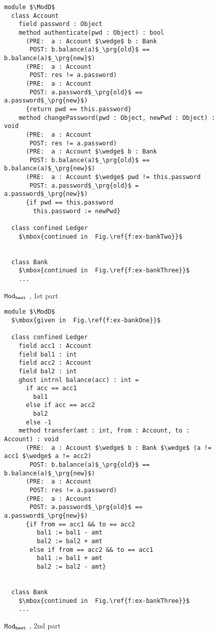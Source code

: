 \begin{figure}[htb]
\begin{lstlisting}[mathescape=true, frame=lines]
module $\ModD$
  class Account
    field password : Object
    method authenticate(pwd : Object) : bool
      (PRE:  a : Account $\wedge$ b : Bank
       POST: b.balance(a)$_\prg{old}$ == b.balance(a)$_\prg{new}$)
      (PRE:  a : Account
       POST: res != a.password)
      (PRE:  a : Account
       POST: a.password$_\prg{old}$ == a.password$_\prg{new}$)
      {return pwd == this.password}
    method changePassword(pwd : Object, newPwd : Object) : void
      (PRE:  a : Account
       POST: res != a.password)
      (PRE:  a : Account $\wedge$ b : Bank
       POST: b.balance(a)$_\prg{old}$ == b.balance(a)$_\prg{new}$)
      (PRE:  a : Account $\wedge$ pwd != this.password
       POST: a.password$_\prg{old}$ = a.password$_\prg{new}$)
      {if pwd == this.password
        this.password := newPwd}

  class confined Ledger
    $\mbox{continued in  Fig.\ref{f:ex-bankTwo}}$
      

  class Bank
    $\mbox{continued in  Fig.\ref{f:ex-bankThree}}$
    ...
\end{lstlisting}
\caption{${\texttt{Mod}}_{{\texttt{best}}}$ \funcSpecs, 1st part}
\label{f:ex-bankOne}
\end{figure}

\begin{figure}[htb]
\begin{lstlisting}[mathescape=true, frame=lines]
module $\ModD$
  $\mbox{given in  Fig.\ref{f:ex-bankOne}}$

  class confined Ledger
    field acc1 : Account
    field bal1 : int
    field acc2 : Account
    field bal2 : int
    ghost intrnl balance(acc) : int = 
      if acc == acc1
        bal1
      else if acc == acc2
        bal2
      else -1
    method transfer(amt : int, from : Account, to : Account) : void
      (PRE:  a : Account $\wedge$ b : Bank $\wedge$ (a != acc1 $\wedge$ a != acc2)
       POST: b.balance(a)$_\prg{old}$ == b.balance(a)$_\prg{new}$)
      (PRE:  a : Account
       POST: res != a.password)
      (PRE:  a : Account
       POST: a.password$_\prg{old}$ == a.password$_\prg{new}$)
      {if from == acc1 && to == acc2
         bal1 := bal1 - amt
         bal2 := bal2 + amt
       else if from == acc2 && to == acc1
         bal1 := bal1 + amt
         bal2 := bal2 - amt}
      

  class Bank
    $\mbox{continued in  Fig.\ref{f:ex-bankThree}}$
    ...
\end{lstlisting}
\caption{${\texttt{Mod}}_{{\texttt{best}}}$ \funcSpecs, 2nd part}
\label{f:ex-bankTwo}
\end{figure}

